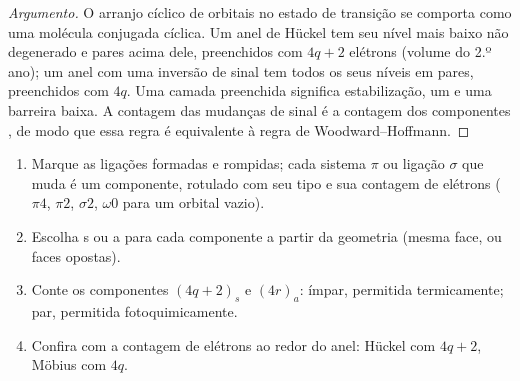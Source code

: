 \begin{proof}[Argumento]
O arranjo cíclico de orbitais no estado de transição se comporta como uma molécula
conjugada cíclica. Um anel de Hückel tem seu nível mais baixo não degenerado e pares
acima dele, preenchidos com $4q + 2$ elétrons (volume do 2.º ano); um anel com uma inversão
de sinal tem todos os seus níveis em pares, preenchidos com $4q$. Uma camada preenchida significa
estabilização, um  e uma barreira baixa. A contagem das mudanças
de sinal é a contagem dos componentes , de modo que essa regra é equivalente à
regra de Woodward--Hoffmann.
\end{proof}

\begin{method}\label{met:b3:pericyclic:components}
\begin{enumerate}
  \item Marque as ligações formadas e rompidas; cada sistema $\pi$ ou ligação $\sigma$ que muda é um
        componente, rotulado com seu tipo e sua contagem de elétrons ($\pi4$, $\pi2$, $\sigma2$, $\omega0$ para
        um orbital vazio).
  \item Escolha s ou a para cada componente a partir da geometria (mesma face, ou
        faces opostas).
  \item Conte os componentes $(4q + 2)_s$ e $(4r)_a$: ímpar, permitida termicamente; par, permitida
        fotoquimicamente.
  \item Confira com a contagem de elétrons ao redor do anel: Hückel com $4q + 2$,
        Möbius com $4q$.
\end{enumerate}
\end{method}

